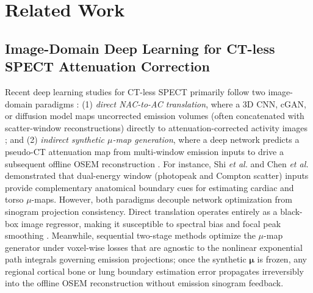 \documentclass[11pt, a4paper]{article}
\begin{document}
\section{Related Work}

\subsection{Image-Domain Deep Learning for CT-less SPECT Attenuation Correction}
Recent deep learning studies for CT-less SPECT primarily follow two image-domain paradigms \cite{ref8}: (1) \textit{direct NAC-to-AC translation}, where a 3D CNN, cGAN, or diffusion model maps uncorrected emission volumes (often concatenated with scatter-window reconstructions) directly to attenuation-corrected activity images \cite{ref18, ref19, ref21, ref22}; and (2) \textit{indirect synthetic $\mu$-map generation}, where a deep network predicts a pseudo-CT attenuation map from multi-window emission inputs to drive a subsequent offline OSEM reconstruction \cite{ref17, ref20}. For instance, Shi \textit{et al.} \cite{ref17} and Chen \textit{et al.} \cite{ref8, ref20} demonstrated that dual-energy window (photopeak and Compton scatter) inputs provide complementary anatomical boundary cues for estimating cardiac and torso $\mu$-maps. However, both paradigms decouple network optimization from sinogram projection consistency. Direct translation operates entirely as a black-box image regressor, making it susceptible to spectral bias and focal peak smoothing \cite{ref23}. Meanwhile, sequential two-stage methods optimize the $\mu$-map generator under voxel-wise losses that are agnostic to the nonlinear exponential path integrals governing emission projections; once the synthetic $\boldsymbol{\mu}$ is frozen, any regional cortical bone or lung boundary estimation error propagates irreversibly into the offline OSEM reconstruction without emission sinogram feedback.
\end{document}
